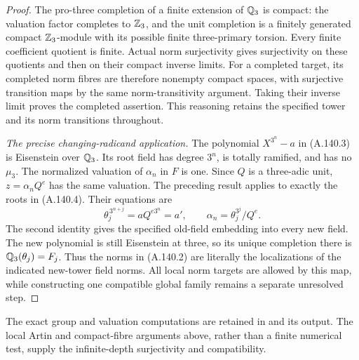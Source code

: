 \begin{proof}
The pro-three completion of a finite
extension of \(\mathbb Q_3\) is compact: the
valuation factor completes to \(\mathbb Z_3\),
and the unit completion is a finitely
generated compact \(\mathbb Z_3\)-module with
its possible finite three-primary torsion.
Every finite coefficient quotient is
finite.
Actual norm surjectivity gives surjectivity
on these quotients and then on their
compact inverse limits.
For a completed target, its completed
norm fibres are therefore nonempty compact
spaces, with surjective transition maps
by the same norm-transitivity argument.
Taking their inverse limit proves the
completed assertion.
This reasoning retains the specified
tower and its norm transitions throughout.

\emph{The precise changing-radicand application.}
The polynomial \(X^{3^n}-a\) in (A.140.3)
is Eisenstein over \(\mathbb Q_3\).
Its root field has degree \(3^n\), is
totally ramified, and has no \(\mu_3\).
The normalized valuation of \(\alpha_n\)
in \(F\) is one.
Since \(Q\) is a three-adic unit,
\(z=\alpha_nQ^e\) has the same valuation.
The preceding result applies to exactly
the roots in (A.140.4).
Their equations are
\[
          \theta_j^{\,3^{n+j}}=aQ^{e3^n}=a',
       \qquad
          \alpha_n=\theta_j^{3^j}/Q^e .
\tag{A.140.12}
\]
The second identity gives the specified
old-field embedding into every new field.
The new polynomial is still Eisenstein
at three, so its unique completion there
is \(\mathbb Q_3(\theta_j)=F_j\).
Thus the norms in (A.140.2) are literally
the localizations of the indicated
new-tower field norms.
All local norm targets are allowed by
this map, while constructing one
compatible global family remains a
separate unresolved step.
\end{proof}

The exact group and valuation computations are retained in
and its output.
The local Artin and compact-fibre arguments above,
rather than a finite numerical test, supply
the infinite-depth surjectivity and compatibility.
